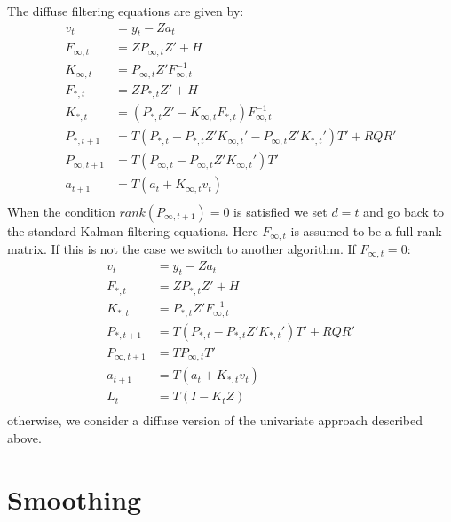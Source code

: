\documentclass{amsart}
\theoremstyle{definition}
\theoremstyle{remark}
\numberwithin{equation}{section}
\begin{document}
\noindent The diffuse filtering equations are given by:
\begin{equation}
\begin{split}
v_t &= y_t - Z  a_t\\
F_{\infty,t} &= Z P_{\infty,t} Z' + H\\
K_{\infty,t} &= P_{\infty,t} Z' F_{\infty,t}^{-1}\\
F_{\ast,t} &= Z P_{\ast,t} Z' + H\\
K_{\ast,t} &= \left(P_{\ast,t} Z' - K_{\infty,t}F_{\ast,t}\right)F_{\infty,t}^{-1}\\
P_{\ast,t+1} &= T (P_{\ast,t}-P_{\ast,t}Z'K_{\infty,t}' - P_{\infty,t}Z'K_{\ast,t}') T' + R Q R'\\
P_{\infty,t+1} &= T(P_{\infty,t}-P_{\infty,t}Z'K_{\infty,t}')T'\\
a_{t+1} &= T (a_t + K_{\infty,t} v_t)\\
\end{split}
\end{equation}
When the condition $rank(P_{\infty,t+1})=0$ is satisfied we set
$d=t$ and go back to the standard Kalman filtering equations. Here
$F_{\infty,t}$ is assumed to be a full rank matrix. If this is not
the case we switch to another algorithm. If $F_{\infty,t}=0$:
\begin{equation}
\begin{split}
v_t &= y_t - Z  a_t\\
F_{\ast,t} &= Z P_{\ast,t} Z' + H\\
K_{\ast,t} &= P_{\ast,t} Z'F_{\infty,t}^{-1}\\
P_{\ast,t+1} &= T (P_{\ast,t}-P_{\ast,t}Z'K_{\ast,t}') T' + R Q R'\\
P_{\infty,t+1} &= TP_{\infty,t}T'\\
a_{t+1} &= T (a_t + K_{\ast,t} v_t)\\
L_t &= T(I - K_t Z)\\
\end{split}
\end{equation}
otherwise, we consider a diffuse version of the univariate
approach described above.

\section{Smoothing}
\end{document}
